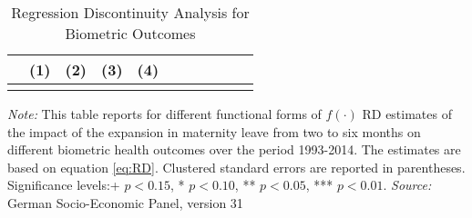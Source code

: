 \documentclass[a4paper ]{article}
\newlength\FHoffset
\begin{document}
\begin{landscape}
	
\end{landscape}
\restoregeometry




	

		\setlength\FHoffset{-0.5cm} 
		\fancyheadoffset{\FHoffset}


\bigskip \bigskip

\begin{table}[p] \centering
\def\sym#1{\ifmmode^{#1}\else\(^{#1}\)\fi}
\caption{Regression Discontinuity Analysis for Biometric Outcomes}\label{tab:RD_BM}
\begin{tabular}{l*{10}{c}}
\toprule
  &\multicolumn{1}{c}{(1)}&\multicolumn{1}{c}{(2)}&\multicolumn{1}{c}{(3)}&\multicolumn{1}{c}{(4)} \\ 
\midrule\\
	 
 \bottomrule
\end{tabular}
\begin{minipage}{0.6\textwidth} %
{\footnotesize \textit{Note:} This table reports for different functional forms of $f(\cdot)$ RD estimates of the impact of the expansion in maternity leave from two to six months on different biometric health outcomes over the period 1993-2014. The estimates are based on equation \ref{eq:RD}. \newline
Clustered standard errors are reported in parentheses. Significance levels:+ \(p<0.15\), * \(p<0.10\), ** \(p<0.05\), *** \(p<0.01\). \newline \textit{Source: }German Socio-Economic Panel, version 31\par}
\end{minipage}
\end{table}
\bigskip \bigskip \bigskip
\end{document}
